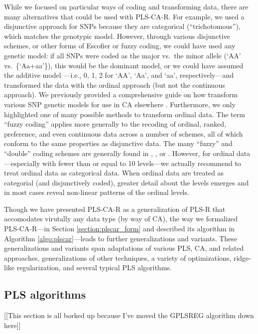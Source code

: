 \documentclass[12pt]{article}
\begin{document}
While we focused on particular ways of coding and transforming data,
there are many alternatives that could be used with PLS-CA-R. For
example, we used a disjunctive approach for SNPs because they are
categorical (``trichotomous''), which matches the genotypic model.
However, through various disjunctive schemes, or other forms of Escofier
or fuzzy coding, we could have used any genetic model: if all SNPs were
coded as the major vs.~the minor allele (`AA' vs.~\{`Aa+aa'\}), this
would be the dominant model, or we could have assumed the additive model
---i.e., 0, 1, 2 for `AA', `Aa', and `aa', respectively---and
transformed the data with the ordinal approach (but not the continuous
approach). We previously provided a comprehensive guide on how transform
various SNP genetic models for use in CA elsewhere \citep[see Appendix
of][]{beaton_partial_2016}. Furthermore, we only highlighted one of many
possible methods to transform ordinal data. The term ``fuzzy coding''
applies more generally to the recoding of ordinal, ranked, preference,
and even continuous data across a number of schemes, all of which
conform to the same properties as disjunctive data. The many ``fuzzy''
and ``double'' coding schemes are generally found in
\citet{escofier_traitement_1979}, \citet{lebart_multivariate_1984}, or
\citet{greenacrefuzzy}. However, for ordinal data---especially with
fewer than or equal to 10 levels---we actually recommend to treat
ordinal data as categorical data. When ordinal data are treated as
categorial (and disjunctively coded), greater detail about the levels
emerges and in most cases reveal non-linear patterns of the ordinal
levels.

Though we have presented PLS-CA-R as a generalization of PLS-R that
accomodates virutally any data type (by way of CA), the way we
formalized PLS-CA-R---in Section \ref{section:plscar_form} and described
its algorithm in Algorithm \ref{algo:plscar}---leads to further
generalizations and variants. These generalizations and variants span
adaptations of various PLS, CA, and related approaches, generalizations
of other techniques, a variety of optimizations, ridge-like
regularization, and several typical PLS algorithms.

\hypertarget{pls-algorithms}{%
\subsection{PLS algorithms}\label{pls-algorithms}}

{[}{[}This section is all borked up because I've moved the GPLSREG
algorithm down here{]}{]}
\end{document}
